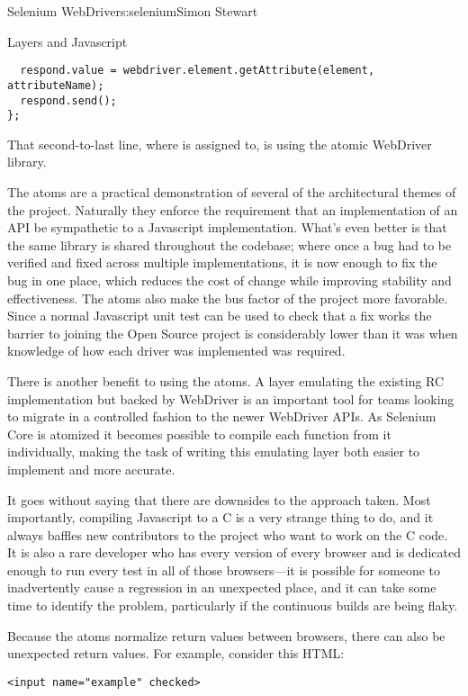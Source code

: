 \begin{aosachapter}{Selenium WebDriver}{s:selenium}{Simon Stewart}
\begin{aosasect1}{Layers and Javascript}
\begin{verbatim}
  respond.value = webdriver.element.getAttribute(element, attributeName);
  respond.send();
};
\end{verbatim}

\noindent That second-to-last line, where  is assigned to,
is using the atomic WebDriver library.

The atoms are a practical demonstration of several of the
architectural themes of the project. Naturally they enforce the
requirement that an implementation of an API be sympathetic to a
Javascript implementation. What's even better is that the same library
is shared throughout the codebase; where once a bug had to be verified
and fixed across multiple implementations, it is now enough to fix the
bug in one place, which reduces the cost of change while improving
stability and effectiveness. The atoms also make the bus factor of the
project more favorable. Since a normal Javascript unit test can be
used to check that a fix works the barrier to joining the Open Source
project is considerably lower than it was when knowledge of how each
driver was implemented was required.

There is another benefit to using the atoms. A layer emulating the
existing RC implementation but backed by WebDriver is an important
tool for teams looking to migrate in a controlled fashion to the newer
WebDriver APIs. As Selenium Core is atomized it becomes possible to
compile each function from it individually, making the task of writing
this emulating layer both easier to implement and more accurate.

It goes without saying that there are downsides to the approach taken.
Most importantly, compiling Javascript to a C  is a very
strange thing to do, and it always baffles new contributors to the
project who want to work on the C code. It is also a rare developer
who has every version of every browser and is dedicated enough to run
every test in all of those browsers---it is possible for someone to
inadvertently cause a regression in an unexpected place, and it can
take some time to identify the problem, particularly if the continuous
builds are being flaky.

Because the atoms normalize return values between browsers, there can
also be unexpected return values. For example, consider this HTML:

\begin{verbatim}
<input name="example" checked>
\end{verbatim}


\end{aosasect1}
\end{aosachapter}
